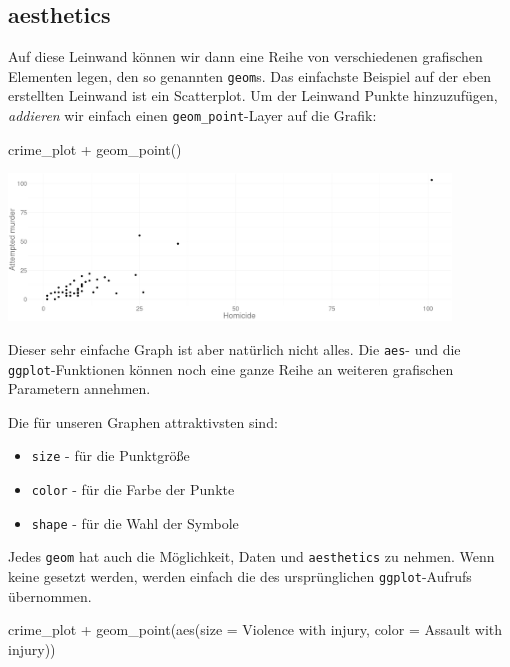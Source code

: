 \documentclass[
]{book}
\newenvironment{Shaded}{\begin{snugshade}}{\end{snugshade}}
\newcommand{\AttributeTok}[1]{\textcolor[rgb]{0.77,0.63,0.00}{#1}}
\newcommand{\FunctionTok}[1]{\textcolor[rgb]{0.00,0.00,0.00}{#1}}
\newcommand{\NormalTok}[1]{#1}
\newcommand{\SpecialCharTok}[1]{\textcolor[rgb]{0.00,0.00,0.00}{#1}}
\newcommand{\StringTok}[1]{\textcolor[rgb]{0.31,0.60,0.02}{#1}}
\providecommand{\tightlist}{%
  \setlength{\itemsep}{0pt}\setlength{\parskip}{0pt}}
\begin{document}
\hypertarget{aesthetics}{%
\subsection{aesthetics}\label{aesthetics}}

Auf diese Leinwand können wir dann eine Reihe von verschiedenen grafischen Elementen legen, den so genannten \texttt{geom}s. Das einfachste Beispiel auf der eben erstellten Leinwand ist ein Scatterplot.
Um der Leinwand Punkte hinzuzufügen, \emph{addieren} wir einfach einen \texttt{geom\_point}-Layer auf die Grafik:

\begin{Shaded}
\begin{Highlighting}[]
\NormalTok{crime\_plot }\SpecialCharTok{+} \FunctionTok{geom\_point}\NormalTok{()}
\end{Highlighting}
\end{Shaded}

\begin{center}\includegraphics[width=333.333333333333pt]{imgs/pts} \end{center}

Dieser sehr einfache Graph ist aber natürlich nicht alles. Die \texttt{aes}- und die \texttt{ggplot}-Funktionen können noch eine ganze Reihe an weiteren grafischen Parametern annehmen.

Die für unseren Graphen attraktivsten sind:

\begin{itemize}
\tightlist
\item
  \texttt{size} - für die Punktgröße
\item
  \texttt{color} - für die Farbe der Punkte
\item
  \texttt{shape} - für die Wahl der Symbole
\end{itemize}

Jedes \texttt{geom} hat auch die Möglichkeit, Daten und \texttt{aesthetics} zu nehmen. Wenn keine gesetzt werden, werden einfach die des ursprünglichen \texttt{ggplot}-Aufrufs übernommen.

\begin{Shaded}
\begin{Highlighting}[]
\NormalTok{crime\_plot }\SpecialCharTok{+} \FunctionTok{geom\_point}\NormalTok{(}\FunctionTok{aes}\NormalTok{(}\AttributeTok{size =} \StringTok{\textasciigrave{}}\AttributeTok{Violence with injury}\StringTok{\textasciigrave{}}\NormalTok{, }
                            \AttributeTok{color =} \StringTok{\textasciigrave{}}\AttributeTok{Assault with injury}\StringTok{\textasciigrave{}}\NormalTok{))}
\end{Highlighting}
\end{Shaded}
\end{document}
